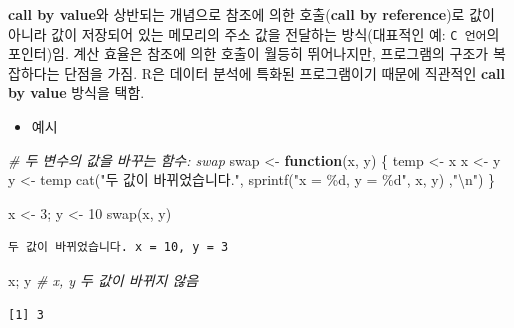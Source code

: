 \documentclass[
  11pt,
]{krantz}
\makeatletter
\newenvironment{Shaded}{\begin{snugshade}}{\end{snugshade}}
\newcommand{\CommentTok}[1]{\textcolor[rgb]{0.37,0.37,0.37}{\textit{#1}}}
\newcommand{\ControlFlowTok}[1]{\textcolor[rgb]{0.27,0.27,0.27}{\textbf{#1}}}
\newcommand{\DecValTok}[1]{\textcolor[rgb]{0.06,0.06,0.06}{#1}}
\newcommand{\FunctionTok}[1]{\textcolor[rgb]{0,0,0}{#1}}
\newcommand{\NormalTok}[1]{#1}
\newcommand{\OtherTok}[1]{\textcolor[rgb]{0.37,0.37,0.37}{#1}}
\newcommand{\SpecialCharTok}[1]{\textcolor[rgb]{0,0,0}{#1}}
\newcommand{\StringTok}[1]{\textcolor[rgb]{0.5,0.5,0.5}{#1}}
\providecommand{\tightlist}{%
  \setlength{\itemsep}{0pt}\setlength{\parskip}{0pt}}
\newenvironment{kframe}{%
\medskip{}
\setlength{\fboxsep}{.8em}
 \def\at@end@of@kframe{}%
 \ifinner\ifhmode%
  \def\at@end@of@kframe{\end{minipage}}%
  \begin{minipage}{\columnwidth}%
 \fi\fi%
 \def\FrameCommand##1{\hskip\@totalleftmargin \hskip-\fboxsep
 \colorbox{shadecolor}{##1}\hskip-\fboxsep
     \hskip-\linewidth \hskip-\@totalleftmargin \hskip\columnwidth}%
 \MakeFramed {\advance\hsize-\width
   \@totalleftmargin\z@ \linewidth\hsize
   \@setminipage}}%
 {\par\unskip\endMakeFramed%
 \at@end@of@kframe}
\newenvironment{rmdblock}[1]
  {
  \begin{itemize}
  \renewcommand{\labelitemi}{
    \raisebox{-.7\height}[0pt][0pt]{
      {\setkeys{Gin}{width=3em,keepaspectratio}\texttt{[image: images/\#1]}}
    }
  }
  \setlength{\fboxsep}{1em}
  \begin{kframe}
  \item
  }
  {
  \end{kframe}
  \end{itemize}
  }
\newenvironment{rmdnote}
  {\begin{rmdblock}{note}}
  {\end{rmdblock}}
\makeatother
\begin{document}
\footnotesize

\begin{rmdnote}
\textbf{call by value}와 상반되는 개념으로 참조에 의한 호출(\textbf{call by reference})로 값이 아니라 값이 저장되어 있는 메모리의 주소 값을 전달하는 방식(대표적인 예: \texttt{C\ 언어}의 포인터)임. 계산 효율은 참조에 의한 호출이 월등히 뛰어나지만, 프로그램의 구조가 복잡하다는 단점을 가짐. R은 데이터 분석에 특화된 프로그램이기 때문에 직관적인 \textbf{call by value} 방식을 택함.
\end{rmdnote}

\normalsize

\begin{itemize}
\tightlist
\item
  예시
\end{itemize}

\footnotesize

\begin{Shaded}
\begin{Highlighting}[]
\CommentTok{\# 두 변수의 값을 바꾸는 함수: swap }
\NormalTok{swap }\OtherTok{\textless{}{-}} \ControlFlowTok{function}\NormalTok{(x, y) \{}
\NormalTok{  temp }\OtherTok{\textless{}{-}}\NormalTok{ x}
\NormalTok{  x }\OtherTok{\textless{}{-}}\NormalTok{ y}
\NormalTok{  y }\OtherTok{\textless{}{-}}\NormalTok{ temp}
  \FunctionTok{cat}\NormalTok{(}\StringTok{"두 값이 바뀌었습니다."}\NormalTok{, }\FunctionTok{sprintf}\NormalTok{(}\StringTok{"x = \%d, y = \%d"}\NormalTok{, x, y)  ,}\StringTok{"}\SpecialCharTok{\textbackslash{}n}\StringTok{"}\NormalTok{)}
\NormalTok{\}}

\NormalTok{x }\OtherTok{\textless{}{-}} \DecValTok{3}\NormalTok{; y }\OtherTok{\textless{}{-}} \DecValTok{10}
\FunctionTok{swap}\NormalTok{(x, y)}
\end{Highlighting}
\end{Shaded}

\begin{verbatim}
두 값이 바뀌었습니다. x = 10, y = 3 
\end{verbatim}

\begin{Shaded}
\begin{Highlighting}[]
\NormalTok{x; y }\CommentTok{\# x, y 두 값이 바뀌지 않음}
\end{Highlighting}
\end{Shaded}

\begin{verbatim}
[1] 3
\end{verbatim}
\end{document}
